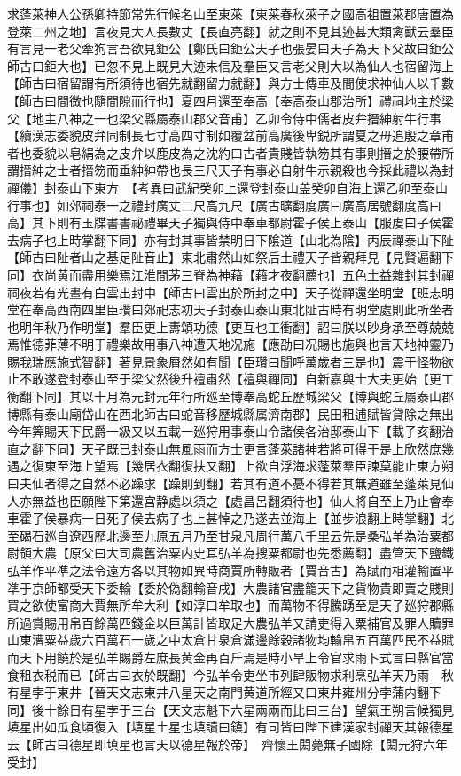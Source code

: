 求蓬萊神人公孫卿持節常先行候名山至東萊【東莱春秋萊子之國高祖置萊郡唐置為登萊二州之地】言夜見大人長數丈【長直亮翻】就之則不見其迹甚大類禽獸云羣臣有言見一老父牽狗言吾欲見鉅公【鄭氏曰鉅公天子也張晏曰天子為天下父故曰鉅公師古曰鉅大也】已忽不見上既見大迹未信及羣臣又言老父則大以為仙人也宿留海上【師古曰宿留謂有所須待也宿先就翻留力就翻】與方士傳車及間使求神仙人以千數【師古曰間微也隨間隙而行也】夏四月還至奉高【奉高泰山郡治所】禮祠地主於梁父【地主八神之一也梁父縣屬泰山郡父音甫】乙卯令侍中儒者皮弁搢紳射牛行事【續漢志委貌皮弁同制長七寸高四寸制如覆盆前高廣後卑鋭所謂夏之毋追殷之章甫者也委貌以皂絹為之皮弁以鹿皮為之沈約曰古者貴賤皆執笏其有事則搢之於腰帶所謂搢紳之士者搢笏而垂紳紳帶也長三尺天子有事必自射牛示親殺也今採此禮以為封禪儀】封泰山下東方　【考異曰武紀癸卯上還登封泰山盖癸卯自海上還乙卯至泰山行事也】如郊祠泰一之禮封廣丈二尺高九尺【廣古曠翻度廣曰廣高居號翻度高曰高】其下則有玉牒書書祕禮畢天子獨與侍中奉車都尉霍子侯上泰山【服䖍曰子侯霍去病子也上時掌翻下同】亦有封其事皆禁明日下隂道【山北為隂】丙辰禪泰山下阯【師古曰阯者山之基足阯音止】東北肅然山如祭后土禮天子皆親拜見【見賢遍翻下同】衣尚黄而盡用樂焉江淮間茅三脊為神藉【藉才夜翻薦也】五色土益雜封其封禪祠夜若有光晝有白雲出封中【師古曰雲出於所封之中】天子從禪還坐明堂【班志明堂在奉高西南四里臣瓚曰郊祀志初天子封泰山泰山東北阯古時有明堂處則此所坐者也明年秋乃作明堂】羣臣更上夀頌功德【更互也工衝翻】詔曰朕以眇身承至尊兢兢焉惟德菲薄不明于禮樂故用事八神遭天地况施【應劭曰况賜也施與也言天地神靈乃賜我瑞應施式智翻】著見景象屑然如有聞【臣瓚曰聞呼萬歲者三是也】震于怪物欲止不敢遂登封泰山至于梁父然後升䄠肅然【䄠與禪同】自新嘉與士大夫更始【更工衡翻下同】其以十月為元封元年行所廵至博奉高蛇丘歷城梁父【博與蛇丘屬泰山郡博縣有泰山廟岱山在西北師古曰蛇音移歷城縣属濟南郡】民田租逋賦皆貸除之無出今年筭賜天下民爵一級又以五載一廵狩用事泰山令諸侯各治邸泰山下【載子亥翻治直之翻下同】天子既已封泰山無風雨而方士更言蓬萊諸神若將可得于是上欣然庶幾遇之復東至海上望焉【幾居衣翻復扶又翻】上欲自浮海求蓬萊羣臣諫莫能止東方朔曰夫仙者得之自然不必躁求【躁則到翻】若其有道不憂不得若其無道雖至蓬萊見仙人亦無益也臣願陛下第還宫静處以須之【處昌呂翻須待也】仙人將自至上乃止會奉車霍子侯暴病一日死子侯去病子也上甚悼之乃遂去並海上【並步浪翻上時掌翻】北至碣石廵自遼西歷北邊至九原五月乃至甘泉凡周行萬八千里云先是桑弘羊為治粟都尉領大農【原父曰大司農舊治粟内史耳弘羊為搜粟都尉也先悉薦翻】盡管天下鹽鐵弘羊作平凖之法令遠方各以其物如異時商賈所轉販者【賈音古】為賦而相灌輸置平凖于京師都受天下委輸【委於偽翻輸音戌】大農諸官盡籠天下之貨物貴即賣之賤則買之欲使富商大賈無所牟大利【如淳曰牟取也】而萬物不得騰踴至是天子廵狩郡縣所過賞賜用帛百餘萬匹錢金以巨萬計皆取足大農弘羊又請吏得入粟補官及罪人贖罪山東漕粟益歲六百萬石一歲之中太倉甘泉倉滿邊餘穀諸物均輸帛五百萬匹民不益賦而天下用饒於是弘羊賜爵左庶長黄金再百斤焉是時小旱上令官求雨卜式言曰縣官當食租衣税而已【師古曰衣於既翻】今弘羊令吏坐市列肆販物求利烹弘羊天乃雨　秋有星孛于東井【晉天文志東井八星天之南門黄道所經又曰東井雍州分孛蒲内翻下同】後十餘日有星孛于三台【天文志魁下六星兩兩而比曰三台】望氣王朔言候獨見填星出如瓜食頃復入【填星土星也填讀曰鎮】有司皆曰陛下建漢家封禪天其報德星云【師古曰德星即填星也言天以德星報於帝】　齊懷王閎薨無子國除【閎元狩六年受封】

